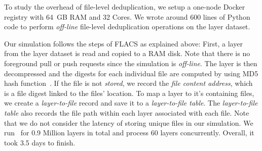 To study the overhead of file-level deduplication, we setup a
one-node Docker registry with 64~GB RAM and 32 Cores.  
%
We wrote around 600 lines of Python code to perform \emph{off-line} file-level deduplication
operations on the layer dataset.
%

% 

Our simulation follows the steps of FLACS as explained above:
First, a layer from the layer dataset is read and copied
to a RAM disk. 
Note that there is no foreground pull or push requests since the simulation is \emph{off-line}.
The layer is then decompressed and 
the digests for each individual file are computed by using MD5 hash function~\cite{MD5}.
%
If the file is not \emph{stored},
we record the \emph{file content address}, which is a
file digest linked to the files' location.
%
To map a layer to it's containing files, we create a \emph{layer-to-file} record
and save it
to a \emph{layer-to-file table}.
%
The \emph{layer-to-file table} also
records the file path within each layer associated with each file.
%
Note that we do not consider the latency of storing unique files in our simulation.
%
%
We run \sysname\ for 0.9 Million layers in total and process 60 layers concurrently. 
%
Overall, it took 3.5 days to finish.
%
%

%
%
%
%

